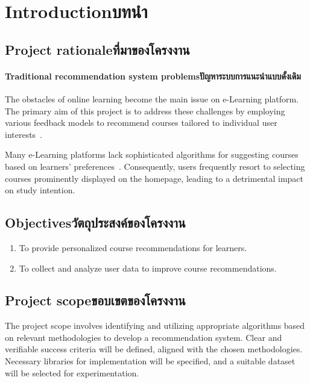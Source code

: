 \chapter{\ifenglish Introduction\else บทนำ\fi}
\section{\ifenglish Project rationale\else ที่มาของโครงงาน\fi}

\subsubsection{\ifenglish Traditional recommendation system problems\else ปัญหาระบบการแนะนำแบบดั้งเดิม\fi}

The obstacles of online learning become the main issue on e-Learning platform.
The primary aim of this project is to address these challenges by employing 
various feedback models to recommend courses tailored to individual user interests~\cite{Liu2020}.

Many e-Learning platforms lack sophisticated algorithms for suggesting courses based on learners' 
preferences~\cite{Wong2007}. Consequently, users frequently resort to selecting courses prominently displayed on 
the homepage, leading to a detrimental impact on study intention.

\section{\ifenglish Objectives\else วัตถุประสงค์ของโครงงาน\fi}
\begin{enumerate}
    \item To provide personalized course recommendations for learners.
    \item To collect and analyze user data to improve course recommendations.
\end{enumerate}

\section{\ifenglish Project scope\else ขอบเขตของโครงงาน\fi}

The project scope involves identifying and utilizing appropriate algorithms based on relevant 
methodologies to develop a recommendation system. Clear and verifiable success criteria will 
be defined, aligned with the chosen methodologies. Necessary libraries for implementation will 
be specified, and a suitable dataset will be selected for experimentation.


